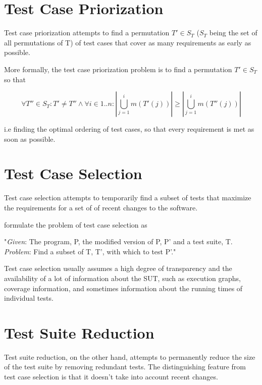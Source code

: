\section{Test Case Priorization}

Test case priorization attempts to find a permutation $T' \in S_{T}$
($S_{T}$ being the set of all permutations of T) of test cases that
cover as many requirements as early as possible.

More formally, the test case priorization problem is to find a permutation
$T' \in S_{T}$ so that

$$ \forall T'' \in S_{T}: T' \neq T'' \land \forall i \in 1..n: |\bigcup_{j=1}^{i} m(T'(j))| \geq |\bigcup_{j=1}^{i} m(T''(j))| $$

i.e finding the optimal ordering of test cases, so that every requirement
is met as soon as possible.


\section{Test Case Selection}

Test case selection attempts to temporarily find a subset of tests that
maximize the requirements for a set of of recent changes to the software.

\cite{yoo2012regression} formulate the problem of test case selection as

"\textit{Given}: The program, P, the modified version of P, P' and a test suite, T. \\
\textit{Problem}: Find a subset of T, T', with which to test P'."

Test case selection usually assumes a high degree of transparency and
the availability of a lot of information about the SUT, such as execution
graphs, coverage information, and sometimes information about the running
times of individual tests.

\section{Test Suite Reduction}

Test suite reduction, on the other hand, attempts to permanently reduce
the size of the test suite by removing redundant tests. The distinguishing
feature from test case selection is that it doesn't take into account
recent changes.


